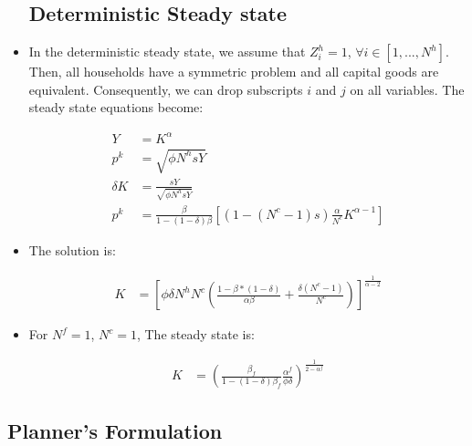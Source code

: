 \documentclass[11pt]{article}
\numberwithin{equation}{section}
\begin{document}
\begin{itemize}
	\subsection{Deterministic Steady state}

	\item In the deterministic steady state, we assume that $Z^h_{i}=1$,  $\forall i \in [1,...,N^h]$. Then, all households have a symmetric problem and all capital goods are equivalent. Consequently, we can drop subscripts $i$ and $j$ on all variables. The steady state equations become:
	
	\begin{align*}
	Y & =  	K^{\alpha}  \\
	p^k & = \sqrt{\phi N^h s Y}\\
	\delta K & = \frac{sY}{ \sqrt{\phi N^h s Y}}\\
	p^k & =\frac{\beta}{1-(1-\delta)\beta} \left[(1-(N^c-1) s)\frac{\alpha}{N^c} K^{\alpha-1}\right]  
	\end{align*}
	
	\item The solution is: 
	
	\begin{align*}
	K & =\left[\phi \delta  N^h N^c \left( \frac{1-\beta*(1-\delta)}{\alpha \beta} + \frac{\delta(N^c-1)}{N^c} \right) \right]^{\frac{1}{\alpha-2} } 
	\end{align*}
	 	
	\item  For $N^f=1$, $N^c=1$, The steady state is:
	
	\begin{align*}
	K & =\left(\frac{ \beta_f}{1-(1-\delta)\beta_f}  \frac{\alpha^f}{\phi \delta} \right)^{\frac{1}{2-\alpha^f}}  
	\end{align*}
	
\end{itemize}
\subsection{Planner's Formulation}
\end{document}
